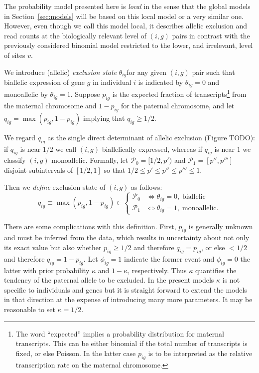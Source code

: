 \documentclass[letterpaper]{article}
\begin{document}
The probability model presented here is \emph{local} in the sense that the
global models in Section~\ref{sec:models} will be based on this local model or
a very similar one.  However, even though we call this model local, it
describes allelic exclusion and read counts at the biologically relevant level
of \((i,g)\) pairs in contrast with the previously considered binomial model
restricted to the lower, and irrelevant, level of sites \(v\).

We introduce (allelic)
\emph{exclusion state} \(\theta_{ig}\)for any given \((i,g)\) pair such that
biallelic expression of gene \(g\) in individual \(i\) is indicated by
\(\theta_{ig}=0\) and monoallelic by \(\theta_{ig}=1\).
Suppose \(p_{ig}\) is the expected fraction of transcripts\footnote{The word
``expected'' implies a probability distribution for maternal transcripts.
This can be either binomial if the total number of transcripts is fixed, or
else Poisson.  In the latter case \(p_{ig}\) is to be interpreted as the
relative transcription rate on the maternal chromosome. } from the maternal
chromosome and \(1-p_{ig}\) for the paternal chromosome, and let
\(q_{ig}=\max(p_{ig},1-p_{ig})\) implying that \(q_{ig}\ge 1/2\).

We regard \(q_{ig}\) as the single direct determinant of
allelic exclusion (Figure TODO): if \(q_{ig}\) is near \(1/2\) we call \((i,g)\)
biallelically expressed, whereas if \(q_{ig}\) is near \(1\) we classify
\((i,g)\) monoallelic.  Formally, let \(\mathcal{P}_0 = [1/2, p')\) and
\(\mathcal{P}_1 = [p'', p''']\) disjoint subintervals of \([1/2,1]\) so that
\(1/2\le p'\le p''\le p'''\le 1\).

Then we \emph{define} exclusion state of \((i,g)\) as follows:
\begin{equation}
\label{eq:def-exclusion-state}
q_{ig} \equiv \max(p_{ig},1-p_{ig}) \in
\begin{cases}
\mathcal{P}_0 & \Leftrightarrow \theta_{ig}=0, \; \text{biallelic} \\
\mathcal{P}_1 & \Leftrightarrow \theta_{ig}=1, \; \text{monoallelic}.
\end{cases}
\end{equation}

There are some complications with this definition.  First, \(p_{ig}\) is
generally unknown and must be inferred from the data, which results in
uncertainty about not only its exact value but also whether
\(p_{ig}\ge 1/2\) and therefore \(q_{ig}=p_{ig}\), or else \(<1/2\) and therefore
\(q_{ig}=1-p_{ig}\).  Let \(\phi_{ig}=1\) indicate the former event and
\(\phi_{ig}=0\) the latter with prior probability \(\kappa\) and
\(1-\kappa\), respectively.  Thus \(\kappa\) quantifies the tendency of the
paternal allele to be excluded. In the present models \(\kappa\) is not
specific to individuals and genes but it is straight forward to extend the
models in that direction at the expense of introducing many more parameters.
It may be reasonable to set \(\kappa=1/2\).
\end{document}
